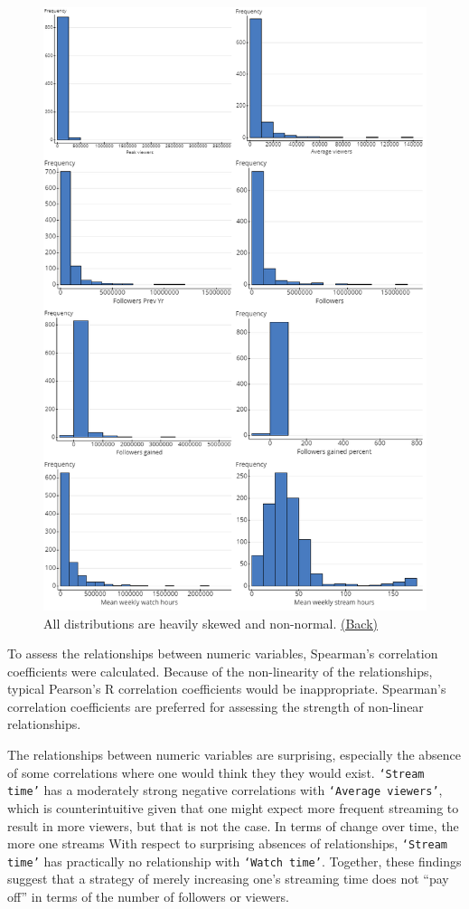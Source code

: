 \documentclass[12pt]{article}
\begin{document}
\begin{figure}[b]
  \centering
  \includegraphics[width=0.8\linewidth]{../StatCrunch_Results/Histogram_Matrix.png}
  \captionsetup{justification=centering, singlelinecheck=false, margin=2cm}
  \caption[Histogram Matrix]{All distributions are heavily skewed and non-normal. \hyperref[sec:toc]{(Back)}}
  \label{fig:histogram_matrix}
\end{figure}

To assess the relationships between numeric variables, Spearman’s correlation coefficients were calculated. Because of the non-linearity of the relationships, typical Pearson’s R correlation coefficients would be inappropriate. Spearman’s correlation coefficients are preferred for assessing the strength of non-linear relationships.

The relationships between numeric variables are surprising, especially the absence of some correlations where one would think they they would exist. \texttt{`Stream time’} has a moderately strong negative correlations with \texttt{`Average viewers’}, which is counterintuitive given that one might expect more frequent streaming to result in more viewers, but that is not the case. In terms of change over time, the more one streams With respect to surprising absences of relationships, \texttt{`Stream time’} has practically no relationship with \texttt{`Watch time’}. Together, these findings suggest that a strategy of merely increasing one’s streaming time does not “pay off” in terms of the number of followers or viewers.
\end{document}
